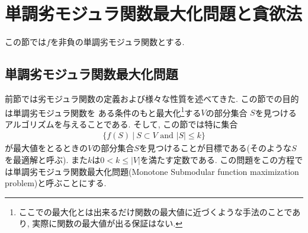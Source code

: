 \documentclass[11pt, a4paper, dvipdfmx]{jsbook}
\theoremstyle{definition}
\begin{document}
\section{単調劣モジュラ関数最大化問題と貪欲法}
この節では$f$を非負の単調劣モジュラ関数とする.
\subsection{単調劣モジュラ関数最大化問題}
 前節では劣モジュラ関数の定義および様々な性質を述べてきた. この節での目的は単調劣モジュラ関数を
 ある条件のもと最大化\footnote{ここでの最大化とは出来るだけ関数の最大値に近づくような手法のことであり, 実際に関数の最大値が出る保証はない.}する$V$の部分集合
 $S$を見つけるアルゴリズムを与えることである.
 そして, この節では特に集合
 \begin{align*}
    \{ f(S)~|~S\subset V\text{ and }|S| \leq k\}
 \end{align*} 
 が最大値をとるときの$V$の部分集合$S$を見つけることが目標である(そのような$S$を最適解と呼ぶ). また$k$は$0<k\leq |V|$を満たす定数である. 
 この問題をこの方程では単調劣モジュラ関数最大化問題(Monotone Submodular function maximization problem)と呼ぶことにする. 
\end{document}
